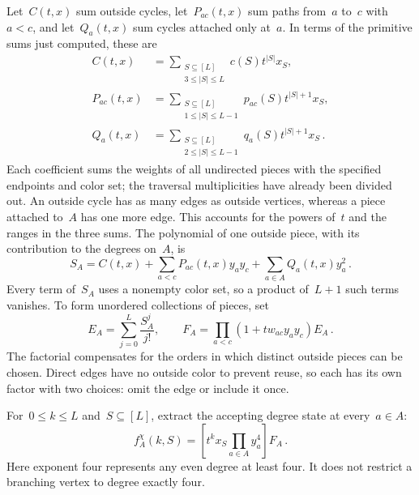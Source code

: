 \documentclass[10pt]{article}
\theoremstyle{plain}
\theoremstyle{definition}
\theoremstyle{remark}
\begin{document}
Let~$C(t,x)$ sum outside cycles, let~$P_{ac}(t,x)$ sum paths from~$a$ to~$c$ with~$a<c$, and let~$Q_a(t,x)$ sum cycles attached only at~$a$. In terms of the primitive sums just computed, these are
\begin{align}
 C(t,x)&=\sum_{\substack{S\subseteq[L]\\3\le|S|\le L}}c(S)t^{|S|}x_S,\label{eq:sk-cycle-poly}\\
 P_{ac}(t,x)&=\sum_{\substack{S\subseteq[L]\\1\le|S|\le L-1}}p_{ac}(S)t^{|S|+1}x_S,\label{eq:sk-path-poly}\\
 Q_a(t,x)&=\sum_{\substack{S\subseteq[L]\\2\le|S|\le L-1}}q_a(S)t^{|S|+1}x_S\,.\label{eq:sk-return-poly}
\end{align}
Each coefficient sums the weights of all undirected pieces with the specified endpoints and color set; the traversal multiplicities have already been divided out. An outside cycle has as many edges as outside vertices, whereas a piece attached to~$A$ has one more edge. This accounts for the powers of~$t$ and the ranges in the three sums. The polynomial of one outside piece, with its contribution to the degrees on~$A$, is
\begin{equation}\label{eq:sk-primitive-sum}
 S_A=C(t,x)+\sum_{a<c}P_{ac}(t,x)y_ay_c+\sum_{a\in A}Q_a(t,x)y_a^2\,.
\end{equation}
Every term of~$S_A$ uses a nonempty color set, so a product of~$L+1$ such terms vanishes. To form unordered collections of pieces, set
\begin{equation}\label{eq:sk-finite-poly}
 E_A=\sum_{j=0}^{L}\frac{S_A^j}{j!},\qquad
 F_A=\prod_{a<c}(1+tw_{ac}y_ay_c)E_A\,.
\end{equation}
The factorial compensates for the orders in which distinct outside pieces can be chosen. Direct edges have no outside color to prevent reuse, so each has its own factor with two choices: omit the edge or include it once.

For~$0\le k\le L$ and~$S\subseteq[L]$, extract the accepting degree state at every~$a\in A$:
\begin{equation}\label{eq:sk-extraction}
 f_A^\chi(k,S)=\left[t^kx_S\prod_{a\in A}y_a^4\right]F_A\,.
\end{equation}
Here exponent four represents any even degree at least four. It does not restrict a branching vertex to degree exactly four.
\end{document}
